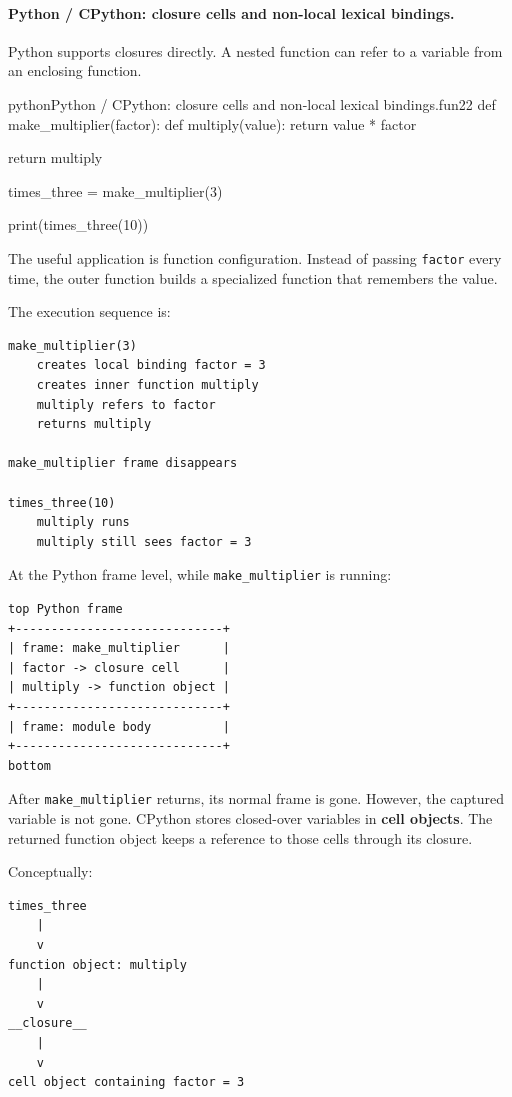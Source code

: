 \paragraph{Python / CPython: closure cells and non-local lexical bindings.}

Python supports closures directly. A nested function can refer to a variable from an enclosing function.

\begin{codebox}[]{python}{Python / CPython: closure cells and non-local lexical bindings.}{fun22}
def make_multiplier(factor):
    def multiply(value):
        return value * factor

    return multiply


times_three = make_multiplier(3)

print(times_three(10))
\end{codebox}


The useful application is function configuration. Instead of passing \texttt{factor} every time, the outer function builds a specialized function that remembers the value.

The execution sequence is:

\begin{verbatim}
make_multiplier(3)
    creates local binding factor = 3
    creates inner function multiply
    multiply refers to factor
    returns multiply

make_multiplier frame disappears

times_three(10)
    multiply runs
    multiply still sees factor = 3
\end{verbatim}

At the Python frame level, while \texttt{make\_multiplier} is running:

\begin{verbatim}
top Python frame
+-----------------------------+
| frame: make_multiplier      |
| factor -> closure cell      |
| multiply -> function object |
+-----------------------------+
| frame: module body          |
+-----------------------------+
bottom
\end{verbatim}

After \texttt{make\_multiplier} returns, its normal frame is gone. However, the captured variable is not gone. CPython stores closed-over variables in \textbf{cell objects}. The returned function object keeps a reference to those cells through its closure.

Conceptually:

\begin{verbatim}
times_three
    |
    v
function object: multiply
    |
    v
__closure__
    |
    v
cell object containing factor = 3
\end{verbatim}


